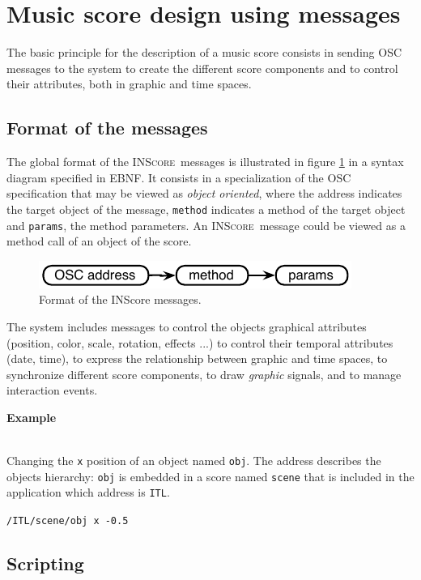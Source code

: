 \documentclass{article}
\newcommand{\inscore}		{\textsc{\small INScore}}
\newcommand{\code}[1]		{\texttt{\small #1}}
\newcounter{excount}
\newcommand{\exemple}			{\vspace{1mm} \hspace*{-4.5mm}\textbf{Example \arabic{excount}} \addtocounter{excount}{1}}
\newcommand{\sample}	[1]		{\begin{center}\colorbox{mygrey}{
								\begin{minipage}[t]{0.95\columnwidth} 
								{\small \texttt{#1}}
								\end{minipage}}\end{center}}
\begin{document}
\section{Music score design using messages}\label{sec:msgs}

The basic principle for the description of a music score consists in sending OSC messages to the system to create the different score components and to control their attributes, both in graphic and time spaces.

\subsection{Format of the messages}
The global format of the \inscore\ messages is illustrated in figure \ref{fig:fgal} in a syntax diagram specified in EBNF. It consists in a specialization of the OSC specification that may be viewed as \emph{object oriented}, where the address indicates the target object of the message, \code{method} indicates a method of the target object and \code{params}, the method parameters. An \inscore\ message could be viewed as a method call of an object of the score.

\begin{figure}[htbp]
\centerline{
	\includegraphics[width=0.8\columnwidth]{imgs/formatgal}}
\caption{Format of the INScore messages.}
\label{fig:fgal}
\end{figure}

The system includes messages to control the objects graphical attributes (position, color, scale, rotation, effects ...) to control their temporal attributes (date, time), to express the relationship between graphic and time spaces, to synchronize different score components, to draw \emph{graphic} signals, and to manage interaction events.

\exemple \\
Changing the \code{x} position of an object named \code{obj}. The address describes the objects hierarchy: \code{obj} is embedded in a score named \code{scene} that is included in the application which address is \code{ITL}.
\vspace{-1mm}\sample{/ITL/scene/obj x -0.5}


\subsection{Scripting}
\end{document}

